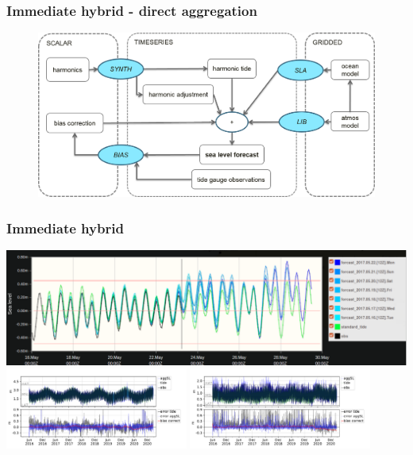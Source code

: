\begin{frame}
\frametitle{Immediate hybrid - direct aggregation}
    \begin{figure}      
    \includegraphics[width=\textwidth]{figures/diagrams/aggSL_schematic_abstract.png}
    \end{figure}
\end{frame}
\begin{frame}
\frametitle{Immediate hybrid}
    \centering
    \includegraphics[width=\textwidth]{figures/plots/forecast_eg.png}
     \vfill{}
    \includegraphics[width=0.45\textwidth]{figures/plots/529020_verify_ts.pdf}
    \includegraphics[width=0.45\textwidth]{figures/plots/523757_verify_ts.pdf}
\end{frame}
